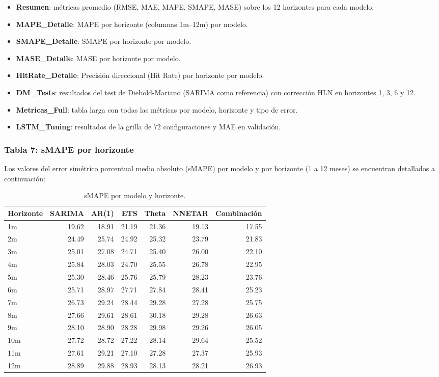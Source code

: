 \documentclass[
  12pt, a4paper, oneside]{article}
\providecommand{\tightlist}{%
  \setlength{\itemsep}{0pt}\setlength{\parskip}{0pt}}
\begin{document}
\begin{itemize}
\tightlist
\item
  \textbf{Resumen}: métricas promedio (RMSE, MAE, MAPE, SMAPE, MASE) sobre los 12 horizontes para cada modelo.
\item
  \textbf{MAPE\_Detalle}: MAPE por horizonte (columnas 1m--12m) por modelo.
\item
  \textbf{SMAPE\_Detalle}: SMAPE por horizonte por modelo.
\item
  \textbf{MASE\_Detalle}: MASE por horizonte por modelo.
\item
  \textbf{HitRate\_Detalle}: Precisión direccional (Hit Rate) por horizonte por modelo.
\item
  \textbf{DM\_Tests}: resultados del test de Diebold-Mariano (SARIMA como referencia) con corrección HLN en horizontes 1, 3, 6 y 12.
\item
  \textbf{Metricas\_Full}: tabla larga con todas las métricas por modelo, horizonte y tipo de error.
\item
  \textbf{LSTM\_Tuning}: resultados de la grilla de 72 configuraciones y MAE en validación.
\end{itemize}

\subsubsection{Tabla 7: sMAPE por horizonte}\label{tabla-7-smape-por-horizonte}

Los valores del error simétrico porcentual medio absoluto (sMAPE) por modelo y por horizonte (1 a 12 meses) se encuentran detallados a continuación:

\begin{table}

\caption{\label{tab:tab-smape}sMAPE por modelo y horizonte.}
\centering
\begin{tabular}[t]{lrrrrrr}
\toprule
Horizonte & SARIMA & AR(1) & ETS & Theta & NNETAR & Combinación\\
\midrule
1m & 19.62 & 18.91 & 21.19 & 21.36 & 19.13 & 17.55\\
2m & 24.49 & 25.74 & 24.92 & 25.32 & 23.79 & 21.83\\
3m & 25.01 & 27.08 & 24.71 & 25.40 & 26.00 & 22.10\\
4m & 25.84 & 28.03 & 24.70 & 25.55 & 26.78 & 22.95\\
5m & 25.30 & 28.46 & 25.76 & 25.79 & 28.23 & 23.76\\
\addlinespace
6m & 25.71 & 28.97 & 27.71 & 27.84 & 28.41 & 25.23\\
7m & 26.73 & 29.24 & 28.44 & 29.28 & 27.28 & 25.75\\
8m & 27.66 & 29.61 & 28.61 & 30.18 & 29.28 & 26.63\\
9m & 28.10 & 28.90 & 28.28 & 29.98 & 29.26 & 26.05\\
10m & 27.72 & 28.72 & 27.22 & 28.14 & 29.64 & 25.52\\
\addlinespace
11m & 27.61 & 29.21 & 27.10 & 27.28 & 27.37 & 25.93\\
12m & 28.89 & 29.88 & 28.93 & 28.13 & 28.21 & 26.93\\
\bottomrule
\end{tabular}
\end{table}
\end{document}
